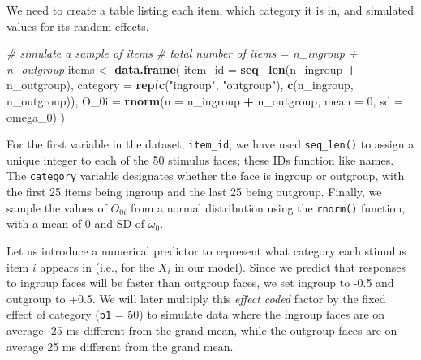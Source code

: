 \documentclass[
  english,
  doc,floatsintext]{apa6}
\newenvironment{Shaded}{\begin{snugshade}}{\end{snugshade}}
\newcommand{\CommentTok}[1]{\textcolor[rgb]{0.56,0.35,0.01}{\textit{#1}}}
\newcommand{\DataTypeTok}[1]{\textcolor[rgb]{0.13,0.29,0.53}{#1}}
\newcommand{\DecValTok}[1]{\textcolor[rgb]{0.00,0.00,0.81}{#1}}
\newcommand{\FloatTok}[1]{\textcolor[rgb]{0.00,0.00,0.81}{#1}}
\newcommand{\KeywordTok}[1]{\textcolor[rgb]{0.13,0.29,0.53}{\textbf{#1}}}
\newcommand{\NormalTok}[1]{#1}
\newcommand{\OperatorTok}[1]{\textcolor[rgb]{0.81,0.36,0.00}{\textbf{#1}}}
\newcommand{\StringTok}[1]{\textcolor[rgb]{0.31,0.60,0.02}{#1}}
\begin{document}
We need to create a table listing each item, which category it is in, and simulated values for its random effects.

\begin{Shaded}
\begin{Highlighting}[]
\CommentTok{# simulate a sample of items}
\CommentTok{# total number of items = n_ingroup + n_outgroup}
\NormalTok{items <-}\StringTok{ }\KeywordTok{data.frame}\NormalTok{(}
  \DataTypeTok{item_id =} \KeywordTok{seq_len}\NormalTok{(n_ingroup }\OperatorTok{+}\StringTok{ }\NormalTok{n_outgroup),}
  \DataTypeTok{category =} \KeywordTok{rep}\NormalTok{(}\KeywordTok{c}\NormalTok{(}\StringTok{"ingroup"}\NormalTok{, }\StringTok{"outgroup"}\NormalTok{), }\KeywordTok{c}\NormalTok{(n_ingroup, n_outgroup)),}
  \DataTypeTok{O_0i =} \KeywordTok{rnorm}\NormalTok{(}\DataTypeTok{n =}\NormalTok{ n_ingroup }\OperatorTok{+}\StringTok{ }\NormalTok{n_outgroup, }\DataTypeTok{mean =} \DecValTok{0}\NormalTok{, }\DataTypeTok{sd =}\NormalTok{ omega_}\DecValTok{0}\NormalTok{)}
\NormalTok{)}
\end{Highlighting}
\end{Shaded}

For the first variable in the dataset, \texttt{item\_id}, we have used \texttt{seq\_len()} to assign a unique integer to each of the 50 stimulus faces; these IDs function like names. The \texttt{category} variable designates whether the face is ingroup or outgroup, with the first 25 items being ingroup and the last 25 being outgroup. Finally, we sample the values of \(O_{0i}\) from a normal distribution using the \texttt{rnorm()} function, with a mean of 0 and SD of \(\omega_0\).

Let us introduce a numerical predictor to represent what category each stimulus item \(i\) appears in (i.e., for the \(X_i\) in our model). Since we predict that responses to ingroup faces will be faster than outgroup faces, we set ingroup to -0.5 and outgroup to +0.5. We will later multiply this \emph{effect coded} factor by the fixed effect of category (\texttt{b1} = 50) to simulate data where the ingroup faces are on average -25 ms different from the grand mean, while the outgroup faces are on average 25 ms different from the grand mean.

\begin{Shaded}
\end{Shaded}
\end{document}
